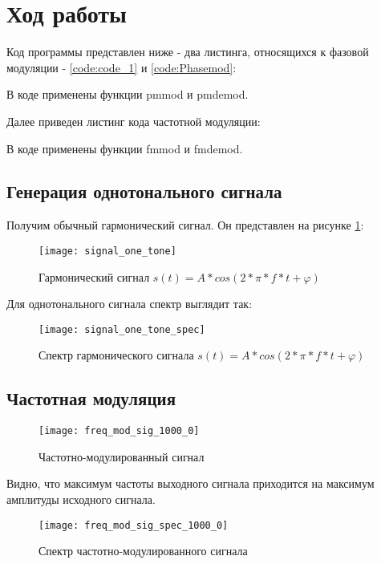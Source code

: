 \section{Ход работы}
Код программы представлен ниже - два листинга, относящихся к фазовой модуляции -  \ref{code:code_1} и \ref{code:Phasemod}:


В коде применены функции pmmod и pmdemod.

Далее приведен листинг кода частотной модуляции:

В коде применены функции fmmod и fmdemod.

\subsection{Генерация однотонального сигнала}
Получим обычный гармонический сигнал. Он представлен на рисунке \ref{pic:signal_one_tone}:
\begin{figure}[H]
	\begin{center}
		\texttt{[image: signal\_one\_tone]}
		\caption{Гармонический сигнал $s(t) = A*cos(2*\pi * f*t + \varphi)$} 
		\label{pic:signal_one_tone} %
	\end{center}
\end{figure}
Для однотонального сигнала спектр выглядит так:
\begin{figure}[H]
	\begin{center}
		\texttt{[image: signal\_one\_tone\_spec]}
		\caption{Спектр гармонического сигнала $s(t) = A*cos(2*\pi * f*t + \varphi)$} 
		\label{pic:signal_one_tone_spec} %
	\end{center}
\end{figure}

\subsection{Частотная модуляция}

\begin{figure}[H]
	\begin{center}
		\texttt{[image: freq\_mod\_sig\_1000\_0]}
		\caption{Частотно-модулированный сигнал} 
		\label{pic:freq_mod_sig_1000_0} %
	\end{center}
\end{figure}
Видно, что максимум частоты выходного сигнала приходится на максимум амплитуды исходного сигнала.
\begin{figure}[H]
	\begin{center}
		\texttt{[image: freq\_mod\_sig\_spec\_1000\_0]}
		\caption{Спектр частотно-модулированного сигнала} 
		\label{pic:freq_mod_sig_spec_1000_0} %
	\end{center}
\end{figure}

